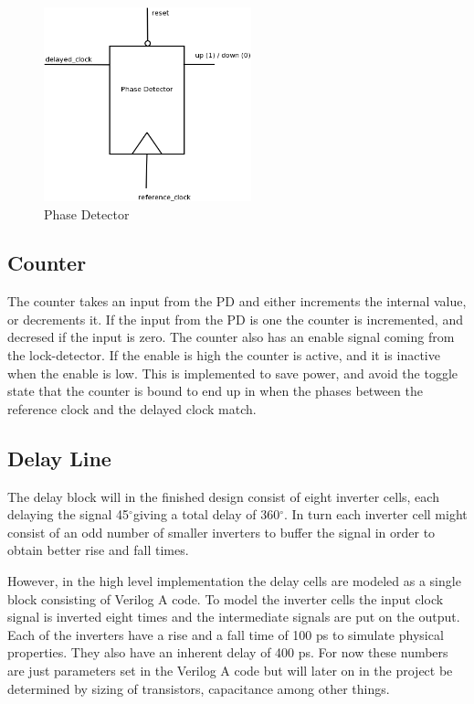 \documentclass[a4paper,12pt]{article} \usepackage{graphicx}
\newcommand{\degree}{\ensuremath{^\circ}}
\begin{document}
\begin{figure}[h!b]
        \centering
        \includegraphics[width=60mm]{../Bilder/PD_dia.png}
        \caption{Phase Detector}
        \label{fig:phase_det}
\end{figure}
 
\subsection{Counter}
The counter takes an input from the PD and either increments
the internal value, or decrements it. If the input from the PD is one the
counter is incremented, and decresed if the input is zero. The counter also has
an enable signal coming from the lock-detector. If the enable is high the counter
is active, and it is inactive when the enable is low. This is implemented to 
save power, and avoid the toggle state that the counter is bound to end up in when
the phases between the reference clock and the delayed clock match.


\subsection{Delay Line}
The delay block will in the finished design consist of eight inverter cells,
each delaying the signal 45\degree giving a total delay of 360\degree. In turn
each inverter cell might consist of an odd number of smaller inverters to buffer
the signal in order to obtain better rise and fall times.

However, in the high level implementation the delay cells are modeled
as a single block consisting of Verilog A code. To model the inverter
cells the input clock signal is inverted eight times and the intermediate
signals are put on the output. Each of the inverters have a rise and a
fall time of 100 ps to simulate physical properties. They also have an
inherent delay of 400 ps. For now these numbers are just parameters set
in the Verilog A code but will later on in the project be determined
by sizing of transistors, capacitance among other things.
\end{document}
